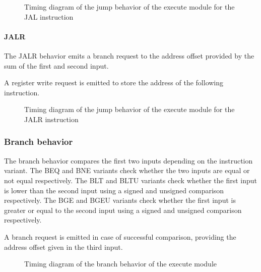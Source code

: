       \begin{figure}[H]
          \centering
          
          \caption{Timing diagram of the jump behavior of the execute module for the JAL instruction}
          \label{fig:exm-behavior-jump-jal}
        \end{figure}

      \paragraph{JALR}

      \begin{content}
          The JALR behavior emits a branch request to the address offset provided by the sum of the first and second input.
          
          A register write request is emitted to store the address of the following instruction.
        \end{content}

      \begin{figure}[H]
          \centering
          
          \caption{Timing diagram of the jump behavior of the execute module for the JALR instruction}
          \label{fig:exm-behavior-jump-jalr}
        \end{figure}

    \subsubsection{Branch behavior}

      \begin{content}
          The branch behavior compares the first two inputs depending on the instruction variant. The BEQ and BNE variants check whether the two inputs are equal or not equal respectively. The BLT and BLTU variants check whether the first input is lower than the second input using a signed and unsigned comparison respectively. The BGE and BGEU variants check whether the first input is greater or equal to the second input using a signed and unsigned comparison respectively.
          
          A branch request is emitted in case of successful comparison, providing the address offset given in the third input.
        \end{content}

      \begin{figure}[H]
          \centering
          
          \caption{Timing diagram of the branch behavior of the execute module}
          \label{fig:exm-behavior-branch}
        \end{figure}

